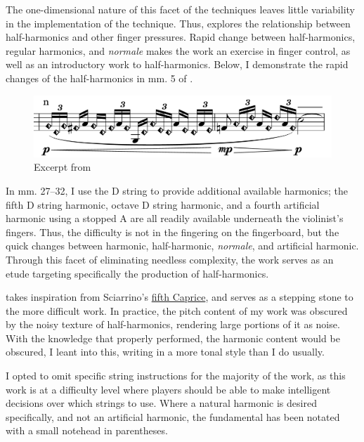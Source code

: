 The one-dimensional nature of this facet of the techniques leaves little variability in the implementation of the technique. 
Thus, \violinPiece\space explores the relationship between half-harmonics and other finger pressures. 
Rapid change between half-harmonics, regular harmonics, and \emph{normale} makes the work an exercise in finger control, as well as an introductory work to half-harmonics.
Below, I demonstrate the rapid changes of the half-harmonics in mm. 5 of \violinPiece.

\begin{figure}
    \includegraphics[width=\linewidth]{./resources/violinHalfHarmonicsExcerpt5.pdf}
    \caption{Excerpt from \violinPiece}\label{fig:Excerpt from what are you doing with the humans, mm. 5}
  \end{figure}

In mm. 27--32, I use the D string to provide additional available harmonics; the fifth D string harmonic, octave D string harmonic, and a fourth artificial harmonic using a stopped A are all readily available underneath the violinist's fingers.
Thus, the difficulty is not in the fingering on the fingerboard, but the quick changes between harmonic, half-harmonic, \emph{normale}, and artificial harmonic.
Through this facet of eliminating needless complexity, the work serves as an etude targeting specifically the production of half-harmonics.

\violinPiece\space takes inspiration from Sciarrino's \hyperref[fig:sciarrinoExcerpt]{fifth Caprice}, and serves as a stepping stone to the more difficult work.\autocite[]{sciarrinoCapricciViolino1976} 
In practice, the pitch content of my work was obscured by the noisy texture of half-harmonics, rendering large portions of it as noise. 
With the knowledge that properly performed, the harmonic content would be obscured, I leant into this, writing in a more tonal style than I do usually.

I opted to omit specific string instructions for the majority of the work, as this work is at a difficulty level where players should be able to make intelligent decisions over which strings to use.
Where a natural harmonic is desired specifically, and not an artificial harmonic, the fundamental has been notated with a small notehead in parentheses. 

